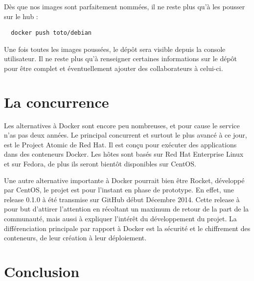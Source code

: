\documentclass[12pt,a4paper]{article}
\begin{document}
Dès que nos images sont parfaitement nommées, il ne reste plus qu'à les pousser sur le hub :

\begin{lstlisting}
  docker push toto/debian
\end{lstlisting}

Une fois toutes les images poussées, le dépôt sera visible depuis la console utilisateur. Il ne reste plus qu'à renseigner certaines informations sur le dépôt pour être complet et éventuellement ajouter des collaborateurs à celui-ci. 

\section{La concurrence}

Les alternatives à Docker sont encore peu nombreuses, et pour cause le service n'as pas deux années. Le principal concurrent et surtout le plus avancé à ce jour, est le Project Atomic de Red Hat. Il est conçu pour exécuter des applications dans des conteneurs Docker. Les hôtes sont basés sur Red Hat Enterprise Linux et sur Fedora, de plus ils seront bientôt disponibles sur CentOS.

Une autre alternative importante à Docker pourrait bien être Rocket, développé par CentOS, le projet est pour l'instant en phase de prototype. En effet, une release 0.1.0 à été transmise sur GitHub début Décembre 2014. Cette release à pour but d'attirer l'attention en récoltant un maximum de retour de la part de la communauté, mais aussi à expliquer l'intérêt du développement du projet. La différenciation principale par rapport à Docker est la sécurité et le chiffrement des conteneurs, de leur création à leur déploiement.
\section{Conclusion}
\end{document}
